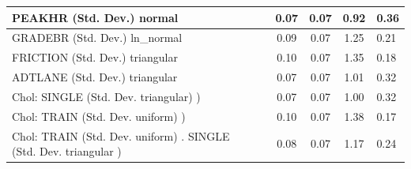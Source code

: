 \begin{table}
\begin{center}
\begin{tabular}{|l|l|c|c|c|l|}
			\hline
			PEAKHR (Std. Dev.) normal &  & 0.07 & 0.07 & 0.92 & 0.36 \\
			\hline
			GRADEBR (Std. Dev.) ln_normal &  & 0.09 & 0.07 & 1.25 & 0.21 \\
			\hline
			FRICTION (Std. Dev.) triangular &  & 0.10 & 0.07 & 1.35 & 0.18 \\
			\hline
			ADTLANE (Std. Dev.) triangular &  & 0.07 & 0.07 & 1.01 & 0.32 \\
			\hline
			 Chol: SINGLE (Std. Dev. triangular) ) &  & 0.07 & 0.07 & 1.00 & 0.32 \\
			\hline
			 Chol: TRAIN (Std. Dev. uniform) ) &  & 0.10 & 0.07 & 1.38 & 0.17 \\
			\hline
			 Chol: TRAIN (Std. Dev. uniform) . SINGLE (Std. Dev.   triangular ) &  & 0.08 & 0.07 & 1.17 & 0.24 \\
			\hline
		\end{tabular}
	\end{center}
\end{table}